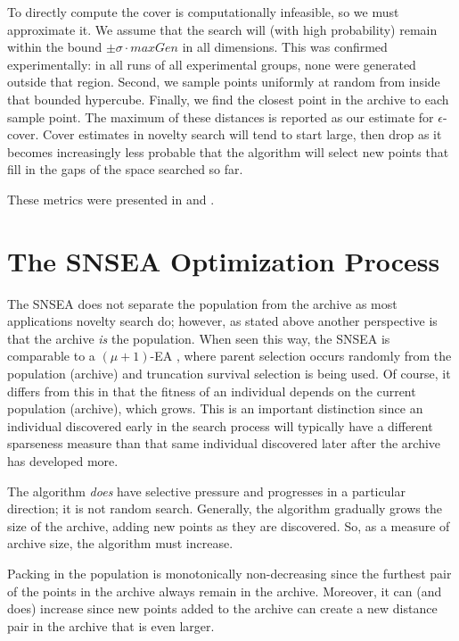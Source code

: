 \documentclass[twoside]{article}
\begin{document}
To directly compute the cover is computationally infeasible, so we must approximate it.  We assume that the search will (with high probability) remain within the bound $\pm\sigma\cdot maxGen$ in all dimensions.  This was confirmed experimentally:  in all runs of all experimental groups, none were generated outside that region.  Second, we sample points uniformly at random from inside that bounded hypercube.  Finally, we find the closest point in the archive to each sample point. The maximum of these distances is reported as our estimate for $\epsilon$-cover.  Cover estimates in novelty search will tend to start large, then drop as it becomes increasingly less probable that the algorithm will select new points that fill in the gaps of the space searched so far.

These metrics were presented in \cite{Wiegand2019flairs} and \cite{Wiegand2021flairs}.



\section{The SNSEA Optimization Process}
\label{sec:results}

The SNSEA does not separate the population from the archive as most applications novelty search do; however, as stated above another perspective is that the archive \emph{is} the population.  When seen this way, the SNSEA is comparable to a $(\mu+1)$-EA \cite{ec:DeJong2006}, where parent selection occurs randomly from the population (archive) and truncation survival selection is being used.  Of course, it differs from this in that the fitness of an individual depends on the current population (archive), which grows.  This is an important distinction since an individual discovered early in the search process will typically have a different sparseness measure than that same individual discovered later after the archive has developed more.

The algorithm \emph{does} have selective pressure and progresses in a particular direction; it is not random search.  Generally, the algorithm gradually grows the size of the archive, adding new points as they are discovered.  So, as a measure of archive size, the algorithm must increase.

Packing in the population is monotonically non-decreasing since the furthest pair of the points in the archive always remain in the archive.  Moreover, it can (and does) increase since new points added to the archive can create a new distance pair in the archive that is even larger.
\end{document}
